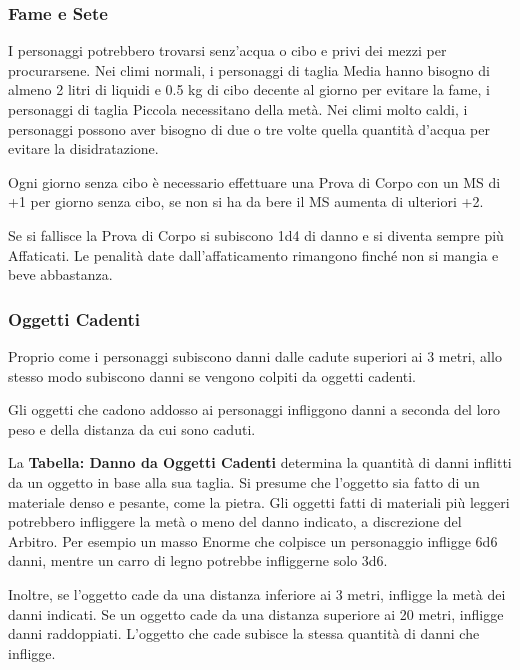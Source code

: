 \documentclass[12pt,a4paper,twoside,openany]{book}
\begin{document}
\begin{multicols}{2}
\subsubsection{Fame e Sete}

\label{fame-e-sete}

I personaggi potrebbero trovarsi senz'acqua o cibo e privi dei mezzi per procurarsene. Nei climi normali, i personaggi di taglia Media hanno bisogno di almeno 2 litri di liquidi e 0.5 kg di cibo decente al giorno per evitare la fame, i personaggi di taglia Piccola necessitano della metà. Nei climi molto caldi, i personaggi possono aver bisogno di due o tre volte quella quantità d'acqua per evitare la disidratazione.

Ogni giorno senza cibo è necessario effettuare una Prova di Corpo con un MS di +1 per giorno senza cibo, se non si ha da bere il MS aumenta di ulteriori +2.

Se si fallisce la Prova di Corpo si subiscono 1d4 di danno e si diventa sempre più Affaticati. Le penalità date dall'affaticamento rimangono finché non si mangia e beve abbastanza.

\subsubsection{Oggetti Cadenti}

\label{oggetti-cadenti}

Proprio come i personaggi subiscono danni dalle cadute superiori ai 3 metri, allo stesso modo subiscono danni se vengono colpiti da oggetti cadenti.

Gli oggetti che cadono addosso ai personaggi infliggono danni a seconda del loro peso e della distanza da cui sono caduti.

La \textbf{Tabella: Danno da Oggetti Cadenti} determina la quantità di danni inflitti da un oggetto in base alla sua taglia. Si presume che l'oggetto sia fatto di un materiale denso e pesante, come la pietra.
Gli oggetti fatti di materiali più leggeri potrebbero infliggere la metà o meno del danno indicato, a discrezione del Arbitro. Per esempio un masso Enorme che colpisce un personaggio infligge 6d6 danni, mentre un carro di legno potrebbe infliggerne solo 3d6.

Inoltre, se l'oggetto cade da una distanza inferiore ai 3 metri, infligge la metà dei danni indicati. Se un oggetto cade da una distanza superiore ai 20 metri, infligge danni raddoppiati. L'oggetto che cade subisce la stessa quantità di danni che infligge.


\end{multicols}
\end{document}
